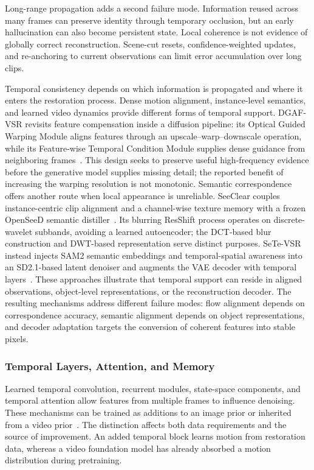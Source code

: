 Long-range propagation adds a second failure mode. Information reused across many frames can preserve identity through temporary occlusion, but an early hallucination can also become persistent state. Local coherence is not evidence of globally correct reconstruction. Scene-cut resets, confidence-weighted updates, and re-anchoring to current observations can limit error accumulation over long clips.

Temporal consistency depends on which information is propagated and where it enters the restoration process. Dense motion alignment, instance-level semantics, and learned video dynamics provide different forms of temporal support. DGAF-VSR revisits feature compensation inside a diffusion pipeline: its Optical Guided Warping Module aligns features through an upscale--warp--downscale operation, while its Feature-wise Temporal Condition Module supplies dense guidance from neighboring frames~\cite{dgaf}. This design seeks to preserve useful high-frequency evidence before the generative model supplies missing detail; the reported benefit of increasing the warping resolution is not monotonic. Semantic correspondence offers another route when local appearance is unreliable. SeeClear couples instance-centric clip alignment and a channel-wise texture memory with a frozen OpenSeeD semantic distiller~\cite{seeclear}. Its blurring ResShift process operates on discrete-wavelet subbands, avoiding a learned autoencoder; the DCT-based blur construction and DWT-based representation serve distinct purposes. SeTe-VSR instead injects SAM2 semantic embeddings and temporal-spatial awareness into an SD2.1-based latent denoiser and augments the VAE decoder with temporal layers~\cite{setevsr}. These approaches illustrate that temporal support can reside in aligned observations, object-level representations, or the reconstruction decoder. The resulting mechanisms address different failure modes: flow alignment depends on correspondence accuracy, semantic alignment depends on object representations, and decoder adaptation targets the conversion of coherent features into stable pixels.

\subsubsection{Temporal Layers, Attention, and Memory}
Learned temporal convolution, recurrent modules, state-space components, and temporal attention allow features from multiple frames to influence denoising. These mechanisms can be trained as additions to an image prior or inherited from a video prior~\cite{upscale,scst,star}. The distinction affects both data requirements and the source of improvement. An added temporal block learns motion from restoration data, whereas a video foundation model has already absorbed a motion distribution during pretraining.

